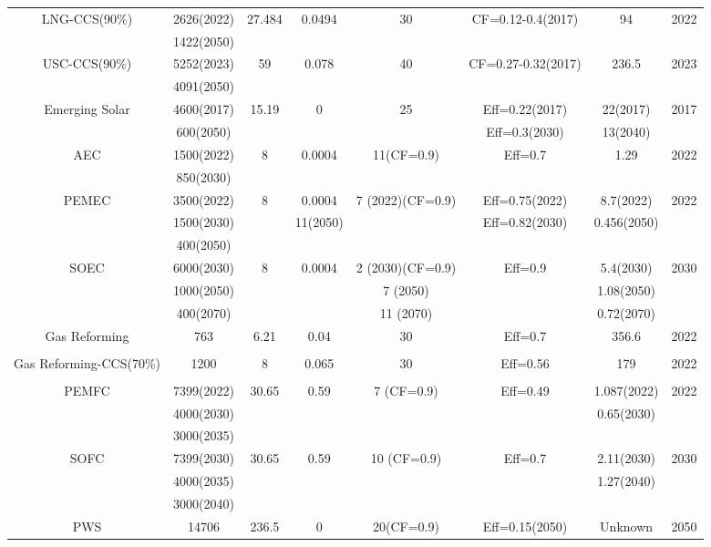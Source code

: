 \begin{landscape}
\begin{longtable}{ |*{8}{c|} }
LNG-CCS(90\%) & 2626(2022) & 27.484 & 0.0494 & 30 & CF=0.12-0.4(2017) & 94 & 2022 \\
 \cite{eia_cost_2020,ipcc_2014} & 1422(2050) &  & &  &  &  & \\
USC-CCS(90\%) & 5252(2023) & 59 & 0.078 & 40 & CF=0.27-0.32(2017) & 236.5 & 2023 \\
 \cite{eia_cost_2020,ipcc_2014} & 4091(2050) &  &  &  &  &  & \\
Emerging Solar & 4600(2017) & 15.19 & 0 & 25 & Eff=0.22(2017) & 22(2017) & 2017 \\
 \cite{irena_solar_2012,peng_review_2013} & 600(2050) &  &  &  &Eff=0.3(2030)  & 13(2040) &  \\
\gls{AEC}  & 1500(2022) & 8 & 0.0004 & 11(CF=0.9) & Eff=0.7 & 1.29 & 2022\\
\cite{iea_technology_2015, bhandari_life_2014, cetinkaya_life_2012, burkhardt_hydrogen_2016} & 850(2030) &  &  &  &  & &  \\
\gls{PEMEC} & 3500(2022) & 8 & 0.0004 & 7 (2022)(CF=0.9) & Eff=0.75(2022) & 8.7(2022) & 2022\\
\cite{iea_technology_2015, bareis_life_2019, carmo_comprehensive_2013,ayers_research_2010,siracusano_influence_2017,schmidt_future_2017,mayyas_manufacturing_2019} & 1500(2030) &  & 11(2050)  &  & Eff=0.82(2030) & 0.456(2050)  &  \\
 & 400(2050) &  &  &  & &  &  \\
\gls{SOEC} & 6000(2030) & 8 & 0.0004 & 2 (2030)(CF=0.9) & Eff=0.9 & 5.4(2030) & 2030\\
\cite{iea_technology_2015,schmidt_future_2017,hafele_life_2016} & 1000(2050) &  &  & 7 (2050) &  & 1.08(2050) & \\
 & 400(2070) &  &  & 11 (2070) &  & 0.72(2070) & \\
Gas Reforming  & 763 & 6.21 & 0.04 & 30  & Eff=0.7 & 356.6 & 2022\\
\cite{iea_technology_2015,mehmeti_life_2018,keipi_economic_2018} & & & & & &  & \\
Gas Reforming-CCS(70\%) & 1200 & 8 & 0.065 & 30 & Eff=0.56 & 179 & 2022\\
\cite{iea_technology_2015,keipi_economic_2018,cormos_ana-maria_economic_2018} &  &  &  &  &  &  & \\
\gls{PEMFC} \cite{iea_technology_2015,simons_life-cycle_2015,kannan_life_2007} & 7399(2022) & 30.65 & 0.59 & 7 (CF=0.9) & Eff=0.49 & 1.087(2022) & 2022\\
 & 4000(2030) &  &  &  &  & 0.65(2030) &  \\
 & 3000(2035) &  &  &  &  &  &  \\
\gls{SOFC} \cite{iea_technology_2015,simons_life-cycle_2015,rillo_life_2017,tu_advances_2004} & 7399(2030) & 30.65 & 0.59 & 10 (CF=0.9) & Eff=0.7 & 2.11(2030) & 2030\\
 & 4000(2035) &  &  &  &  & 1.27(2040) &  \\
 & 3000(2040) &  &  &  &  & &  \\
\gls{PWS} \cite{pinaud_technical_2013} & 14706  & 236.5 & 0 & 20(CF=0.9) & Eff=0.15(2050) & Unknown & 2050
\label{eco}
\end{longtable}
\end{landscape}
